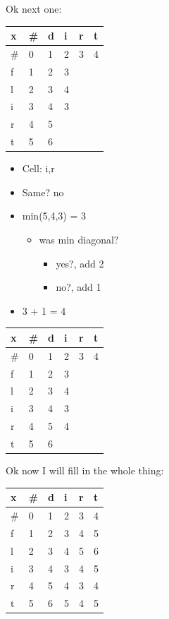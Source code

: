 \documentclass[
  11pt,
  british,
]{article}
\providecommand{\tightlist}{%
  \setlength{\itemsep}{0pt}\setlength{\parskip}{0pt}}
\begin{document}
Ok next one:

\begin{longtable}[]{@{}llllll@{}}
\toprule
x & \# & d & i & r & t \\
\midrule
\endhead
\# & 0 & 1 & 2 & 3 & 4 \\
f & 1 & 2 & 3 & & \\
l & 2 & 3 & 4 & & \\
i & 3 & 4 & 3 & & \\
r & 4 & 5 & & & \\
t & 5 & 6 & & & \\
\bottomrule
\end{longtable}

\begin{itemize}
\tightlist
\item
  Cell: i,r
\item
  Same? no
\item
  min(5,4,3) = 3

  \begin{itemize}
  \tightlist
  \item
    was min diagonal?

    \begin{itemize}
    \tightlist
    \item
      yes?, add 2
    \item
      no?, add 1
    \end{itemize}
  \end{itemize}
\item
  3 + 1 = 4
\end{itemize}

\begin{longtable}[]{@{}llllll@{}}
\toprule
x & \# & d & i & r & t \\
\midrule
\endhead
\# & 0 & 1 & 2 & 3 & 4 \\
f & 1 & 2 & 3 & & \\
l & 2 & 3 & 4 & & \\
i & 3 & 4 & 3 & & \\
r & 4 & 5 & 4 & & \\
t & 5 & 6 & & & \\
\bottomrule
\end{longtable}

Ok now I will fill in the whole thing:

\begin{longtable}[]{@{}llllll@{}}
\toprule
x & \# & d & i & r & t \\
\midrule
\endhead
\# & 0 & 1 & 2 & 3 & 4 \\
f & 1 & 2 & 3 & 4 & 5 \\
l & 2 & 3 & 4 & 5 & 6 \\
i & 3 & 4 & 3 & 4 & 5 \\
r & 4 & 5 & 4 & 3 & 4 \\
t & 5 & 6 & 5 & 4 & 5 \\
\bottomrule
\end{longtable}
\end{document}
